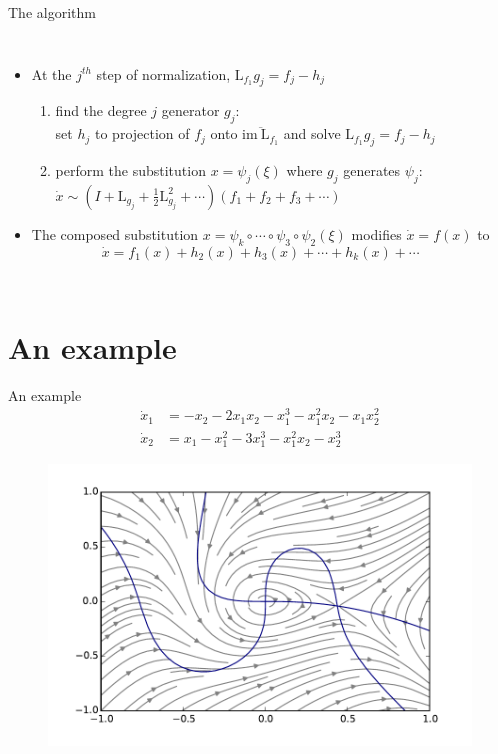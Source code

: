\documentclass[10pt,T]{beamer}
\begin{document}
\begin{frame}{The algorithm}
\begin{columns}[T,onlytextwidth]
\column{\textwidth}
\begin{itemize}
\item At the $j^{th}$ step of normalization, $\text{L}_{f_1}g_j=f_j-h_j$\\[5mm]
\begin{enumerate}
\item<2-> find the degree $j$ generator $g_j$:\\[2mm]
  set $h_j$ to projection of $f_j$ onto $\overline{\text{im}~\text{L}_{f_1}}$ and solve $\text{L}_{f_1}g_j=f_j-h_j$\\[5mm]
\item<3-> perform the substitution $x=\psi_{j}(\xi)$ where $g_j$ generates $\psi_j$:\\[2mm]
  $\dot{x}\sim\left(I+\text{L}_{g_j}+\frac12\text{L}^2_{g_j}+\cdots\right)(f_{1}+f_{2}+f_{3}+\cdots)$\\[5mm]
\end{enumerate}
\item<4-> The composed substitution $x=\psi_k\circ\cdots\circ\psi_3\circ\psi_2(\xi)$ modifies $\dot{x}=f(x)$ to $$\dot{x}=f_1(x)+h_2(x)+h_3(x)+\cdots+h_k(x)+\cdots$$
\end{itemize}
\end{columns}
\end{frame}

\section{An example}

\begin{frame}[t]{An example}
\begin{equation*}
  \begin{aligned}
    \dot{x}_1 &= -x_2 -2x_1x_2 -x_1^3 - x_1^2x_2 -x_1x_2^2 \\
    \dot{x}_2 &= x_1 - x_1^2 - 3x_1^3 - x_1^2x_2 - x_2^3
  \end{aligned}
\end{equation*}
\begin{figure}
  \centering
  \includegraphics[keepaspectratio,width=.75\textwidth]{./fig/example.pdf}
\end{figure}
\end{frame}
\end{document}
